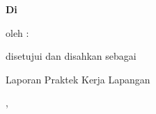 \clearpage
\thispagestyle{plain}

\begin{center}
\spasisetengah
{}
\vspace{12pt}

\textbf{\TopikKP}\par
\vspace{12pt}
\textbf{Di \NamaPerusahaan}\par
\vspace{6pt}
oleh :\par
\vspace{6pt}
\NamaMhs\par
\NIM\par
\vspace{36pt}
disetujui dan disahkan sebagai\par
Laporan Praktek Kerja Lapangan\par
\end{center}

\vspace{6pt}
\noindent\begin{minipage}{0.62\textwidth}\raggedright\parindent=0pt\parskip=0pt
\KotaInstansi, \TanggalInstansi\par
\JabatanPembimbingInstansi\par
{}\par
\vspace{1.2cm}
\NamaPembimbingInstansi\par
\NoPegawaiPembimbingInstansi\par
\end{minipage}
